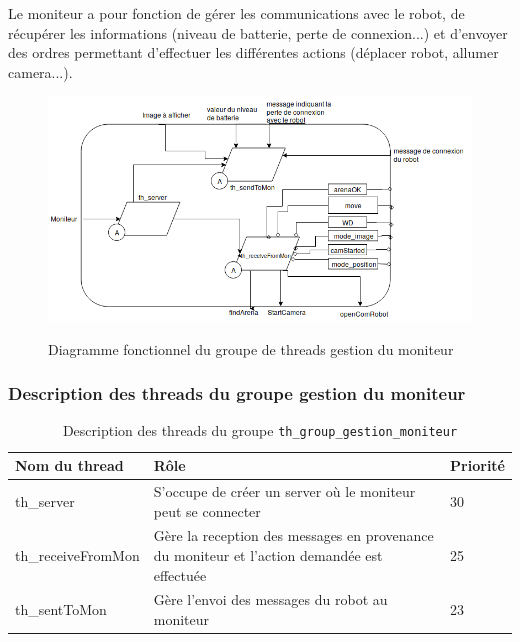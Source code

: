 \documentclass[11pt, a4paper]{paper}
\begin{document}
{Le moniteur a pour fonction de gérer les communications avec le robot, de récupérer les informations (niveau de batterie, perte de connexion...) et d'envoyer des ordres permettant d'effectuer les différentes actions (déplacer robot, allumer camera...).}

\begin{figure}[htbp]
\label{fig:diag_fonc_moniteur}
\begin{center}
{\includegraphics[scale=.4]{./dossier_conception/diag_fonc_moniteur}}
{\caption{Diagramme fonctionnel du groupe de threads gestion du moniteur}}
\end{center}
\end{figure}
\FloatBarrier

\subsubsection{Description des threads  du groupe gestion du moniteur}

\begin{table}[htp]
\caption{Description des threads du groupe {\tt th\_group\_gestion\_moniteur}}
\begin{center}
\begin{tabular}{|p{4cm}|p{7.5cm}|p{2cm}|}
\hline
\bf Nom du thread &	\bf Rôle &	\bf Priorité \\
\hline
\hline
\color{blue}th\_server	& \color{blue}S'occupe de créer un server où le moniteur peut se connecter & \color{blue}30\\
\hline
\color{blue}th\_receiveFromMon &	\color{blue}Gère la reception des messages en provenance du moniteur et l'action demandée est effectuée &	\color{blue}25\\
\hline
\color{blue}th\_sentToMon	& \color{blue}Gère l'envoi des messages du robot au moniteur & \color{blue}23\\
\hline
\end{tabular}
\end{center}
\label{tab:gt_moniteur}
\end{table}%
\end{document}
